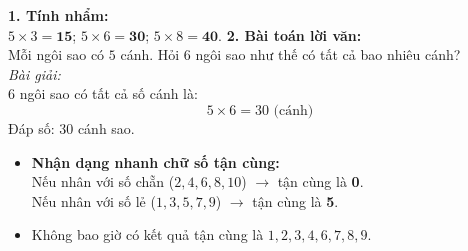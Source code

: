 \documentclass[11pt,a4paper]{article}
\begin{document}
\vspace{-1.5mm}
\noindent
\begin{minipage}[t]{0.49\textwidth}\vspace{0pt}
\begin{tcolorbox}[
  enhanced,
  colback=green!4!white,
  colframe=green!60!black,
  arc=2mm, boxrule=0.8pt,
  left=2mm, right=2mm, top=1.8mm, bottom=1.8mm,
  title={\footnotesize\bfseries\color{white}\faCheckCircle\ 4. Ví dụ thực hành chuẩn mực}
]
{\footnotesize
\textbf{1. Tính nhẩm:}\\
$5 \times 3 = \mathbf{15}$; $5 \times 6 = \mathbf{30}$; $5 \times 8 = \mathbf{40}$.
\textbf{2. Bài toán lời văn:}\\
Mỗi ngôi sao có $5$ cánh. Hỏi $6$ ngôi sao như thế có tất cả bao nhiêu cánh?\\
\textit{Bài giải:}\\
$6$ ngôi sao có tất cả số cánh là:
$$5 \times 6 = 30\text{ (cánh)}$$
Đáp số: $30$ cánh sao.
}
\end{tcolorbox}
\end{minipage}
\hfill
\begin{minipage}[t]{0.49\textwidth}\vspace{0pt}
\begin{tcolorbox}[
  enhanced,
  colback=red!4!white,
  colframe=red!75!black,
  arc=2mm, boxrule=0.8pt,
  left=2mm, right=2mm, top=1.8mm, bottom=1.8mm,
  title={\footnotesize\bfseries\color{white}\faExclamationTriangle\ 5. Mẹo tránh bẫy trắc nghiệm}
]
{\footnotesize
\begin{itemize}\setlength{\itemsep}{1pt}\setlength{\leftskip}{-2.5mm}
  \item \textbf{Nhận dạng nhanh chữ số tận cùng:}\\
  Nếu nhân với số chẵn ($2, 4, 6, 8, 10$) $\to$ tận cùng là \textbf{0}.\\
  Nếu nhân với số lẻ ($1, 3, 5, 7, 9$) $\to$ tận cùng là \textbf{5}.
  \item Không bao giờ có kết quả tận cùng là $1, 2, 3, 4, 6, 7, 8, 9$.
\end{itemize}
}
\end{tcolorbox}
\end{minipage}
\end{document}
